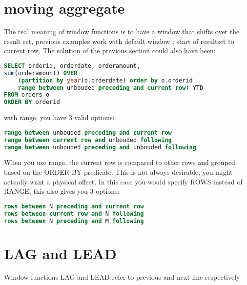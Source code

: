 \documentclass{report}
\begin{document}
	\section{moving aggregate}
	The real meaning of window functions is to have a window that shifts over the result set, previous examples work with default window : start of resultset to current row. The solution of the previous section could also have been: 
	\begin{lstlisting}[language=sql]
SELECT orderid, orderdate, orderamount,
sum(orderamount) OVER 
	(partition by year(o.orderdate) order by o.orderid
	range between unbouded preceding and current row) YTD
FROM orders o
ORDER BY orderid	\end{lstlisting}
	with range, you have 3 valid options: 
	\begin{lstlisting}[language = sql]
range between unbouded preceding and current row
range between current row and unbouded following
range between unbouded preceding and unbouded following	\end{lstlisting}
	When you use range, the current row is compared to other rows and grouped based on the ORDER BY predicate. This is not always desirable, you might actually want a physical offset. In this case you would specify ROWS instead of RANGE, this also gives you 3 options: 
	\begin{lstlisting}[language = sql]
rows between N preceding and current row
rows between current row and N following
rows between N preceding and M following	\end{lstlisting}

	\section{LAG and LEAD}
	Window functions LAG and LEAD refer to previous and next line respectively
		
\end{document}
